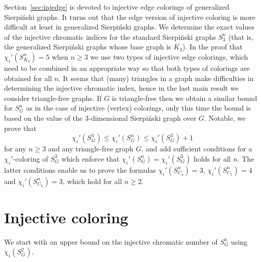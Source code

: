 \documentclass{article}
\begin{document}
Section~\ref{sec:injedge} is devoted to injective edge colorings of generalized Sierpi\'{n}ski graphs. It turns out that the edge version of injective coloring is more difficult at least in generalized Sierpi\'{n}ski graphs. We determine the exact values of the injective chromatic indices for the standard Sierpi\'{n}ski graphs $S_3^n$ (that is, the generalized Sierpi\'{n}ski graphs whose base graph is $K_3$). In the proof that $\chi_i'(S_{K_3}^n)=5$ when $n\ge 3$ we use two types of injective edge colorings, which need to be combined in an appropriate way so that both types of colorings are obtained for all $n$. It seems that (many) triangles in a graph make difficulties in determining the injective chromatic index, hence in the last main result we consider triangle-free graphs. If $G$ is triangle-free then we obtain a similar bound for $S_G^n$ as in the case of injective (vertex) colorings, only this time the bound is based on the value of the $3$-dimensional Sierpi\'{n}ski graph over $G$. Notable, we prove that $$\chi_i'(S_G^3)\le \chi_i'(S_G^n)\le \chi_i'(S_G^3)+1$$ for any $n\ge 3$ and any triangle-free graph $G$, and add sufficient conditions for a $\chi_i'$-coloring of $S_G^3$ which enforce that $\chi_i'(S_G^n)=\chi_i'(S_G^3)$ holds for all $n$. The latter conditions enable us to prove the formulas $\chi_i'(S_{C_4}^n)=3$, $\chi_i'(S_{C_5}^n)=4$ and $\chi_i'(S_{C_6}^n)=3$, which hold for all $n\ge 2$.  

\section{Injective coloring}
\label{sec:inj}

We start with an upper bound on the injective chromatic number of $S_G^n$ using  
$\chi_i(S_G^2)$. 
\end{document}
